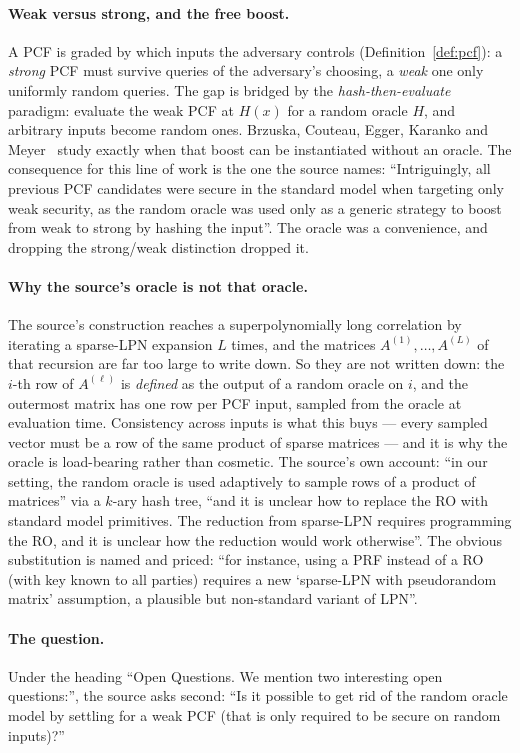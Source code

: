 \documentclass{conjura-conjecture}
\begin{document}
\paragraph{Weak versus strong, and the free boost.}
A PCF is graded by which inputs the adversary controls
(Definition~\ref{def:pcf}): a \emph{strong} PCF must survive queries of
the adversary's choosing, a \emph{weak} one only uniformly random
queries. The gap is bridged by the \emph{hash-then-evaluate} paradigm:
evaluate the weak PCF at $H(x)$ for a random oracle $H$, and arbitrary
inputs become random ones. Brzuska, Couteau, Egger, Karanko and
Meyer~\cite{BCEKM24} study exactly when that boost can be instantiated
without an oracle. The consequence for this line of work is the one the
source names: ``Intriguingly, all previous PCF candidates were secure in
the standard model when targeting only weak security, as the random
oracle was used only as a generic strategy to boost from weak to strong
by hashing the input''. The oracle was a convenience, and dropping the
strong/weak distinction dropped it.

\paragraph{Why the source's oracle is not that oracle.}
The source's construction reaches a superpolynomially long correlation
by iterating a sparse-LPN expansion $L$ times, and the matrices
$A^{(1)}, \dots, A^{(L)}$ of that recursion are far too large to write
down. So they are not written down: the $i$-th row of $A^{(\ell)}$ is
\emph{defined} as the output of a random oracle on $i$, and the
outermost matrix has one row per PCF input, sampled from the oracle at
evaluation time. Consistency across inputs is what this buys --- every
sampled vector must be a row of the same product of sparse matrices ---
and it is why the oracle is load-bearing rather than cosmetic. The
source's own account: ``in our setting, the random oracle is used
adaptively to sample rows of a product of matrices'' via a $k$-ary hash
tree, ``and it is unclear how to replace the RO with standard model
primitives. The reduction from sparse-LPN requires programming the RO,
and it is unclear how the reduction would work otherwise''. The obvious
substitution is named and priced: ``for instance, using a PRF instead of
a RO (with key known to all parties) requires a new `sparse-LPN with
pseudorandom matrix' assumption, a plausible but non-standard variant
of LPN''.

\paragraph{The question.}
Under the heading ``Open Questions. We mention two interesting open
questions:'', the source asks second: ``Is it possible to get rid of the
random oracle model by settling for a weak PCF (that is only required to
be secure on random inputs)?''
\end{document}
